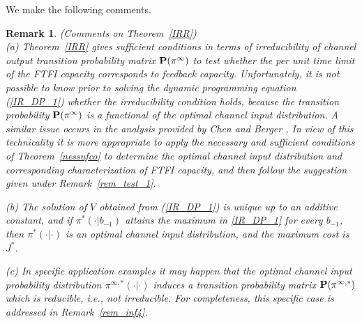 \documentclass[11pt, a4paper, journal,onecolumn]{IEEEtran}
\newtheorem{remark}{Remark}[section]
\begin{document}
We make the following comments.\\


\begin{remark}(Comments on Theorem~\ref{IRR})\\
(a) Theorem~\ref{IRR} gives sufficient conditions in terms of irreducibility of channel output transition probability matrix ${\bf P}(\pi^\infty)$  to test whether the per unit time limit of the FTFI capacity corresponds to feedback capacity. Unfortunately, it is not possible to know prior to solving the dynamic programming equation (\ref{IR_DP_1}) whether the irreducibility condition holds, because the transition probability ${\bf P}(\pi^\infty)$ is a functional of the optimal channel input distribution. A similar issue occurs in the analysis provided by Chen and Berger \cite[Lemma~2, Theorem~3]{chen-berger2005},  In view of this technicality it is more appropriate to apply the necessary and sufficient conditions of Theorem~\ref{nessufco} to determine the optimal channel input distribution and corresponding characterization of FTFI capacity, and then follow the suggestion given under Remark~\ref{rem_test_1}. 

(b) The solution of $V$ obtained from (\ref{IR_DP_1}) is unique up to an additive constant, and if $\pi^*(\cdot|b_{-1})$ attains the maximum in \eqref{IR_DP_1} for every $b_{-1}$, then $\pi^*(\cdot|\cdot)$ is an optimal channel input  distribution, and the maximum cost is $J^*$. 

(c) In specific application examples it may happen that the optimal channel input probability distribution   $\pi^{\infty,*}(\cdot|\cdot)$ induces a transition probability matrix ${\bf P}(\pi^{\infty,*})$ which is reducible, i.e., not irreducible.  For completeness, this specific case is addressed in Remark~\ref{rem_inf4}.
\end{remark}
\end{document}
